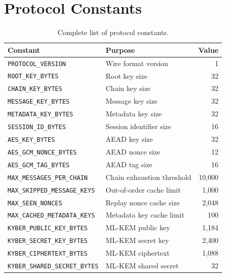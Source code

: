 \documentclass[11pt,a4paper]{article}
\theoremstyle{definition}
\begin{document}
\appendix

\section{Protocol Constants}\label{app:constants}

\begin{table}[H]
\centering
\caption{Complete list of protocol constants.}\label{tab:constants}
\small
\begin{tabular}{@{}llr@{}}
\toprule
Constant & Purpose & Value \\
\midrule
\texttt{PROTOCOL\_VERSION} & Wire format version & 1 \\
\texttt{ROOT\_KEY\_BYTES} & Root key size & 32 \\
\texttt{CHAIN\_KEY\_BYTES} & Chain key size & 32 \\
\texttt{MESSAGE\_KEY\_BYTES} & Message key size & 32 \\
\texttt{METADATA\_KEY\_BYTES} & Metadata key size & 32 \\
\texttt{SESSION\_ID\_BYTES} & Session identifier size & 16 \\
\texttt{AES\_KEY\_BYTES} & AEAD key size & 32 \\
\texttt{AES\_GCM\_NONCE\_BYTES} & AEAD nonce size & 12 \\
\texttt{AES\_GCM\_TAG\_BYTES} & AEAD tag size & 16 \\
\texttt{MAX\_MESSAGES\_PER\_CHAIN} & Chain exhaustion threshold & 10{,}000 \\
\texttt{MAX\_SKIPPED\_MESSAGE\_KEYS} & Out-of-order cache limit & 1{,}000 \\
\texttt{MAX\_SEEN\_NONCES} & Replay nonce cache size & 2{,}048 \\
\texttt{MAX\_CACHED\_METADATA\_KEYS} & Metadata key cache limit & 100 \\
\texttt{KYBER\_PUBLIC\_KEY\_BYTES} & ML-KEM public key & 1{,}184 \\
\texttt{KYBER\_SECRET\_KEY\_BYTES} & ML-KEM secret key & 2{,}400 \\
\texttt{KYBER\_CIPHERTEXT\_BYTES} & ML-KEM ciphertext & 1{,}088 \\
\texttt{KYBER\_SHARED\_SECRET\_BYTES} & ML-KEM shared secret & 32 \\
\bottomrule
\end{tabular}
\end{table}
\end{document}
